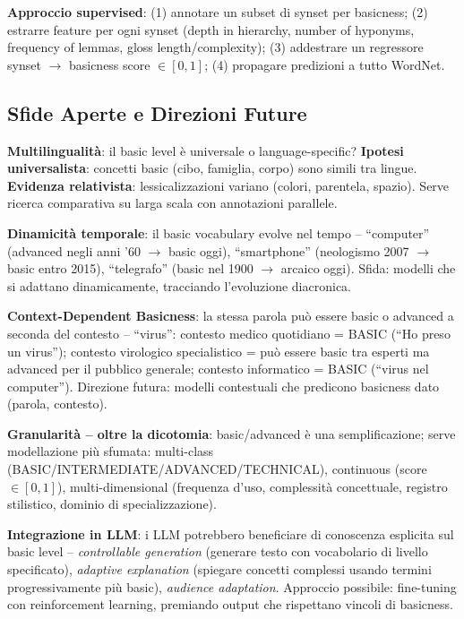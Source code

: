 \documentclass[12pt,a4paper]{article}
\begin{document}
\textbf{Approccio supervised}: (1) annotare un subset di synset per basicness; (2) estrarre feature per ogni synset (depth in hierarchy, number of hyponyms, frequency of lemmas, gloss length/complexity); (3) addestrare un regressore synset $\to$ basicness score $\in [0,1]$; (4) propagare predizioni a tutto WordNet.

\subsection{Sfide Aperte e Direzioni Future}

\textbf{Multilingualit\`a}: il basic level \`e universale o language-specific? \textbf{Ipotesi universalista}: concetti basic (cibo, famiglia, corpo) sono simili tra lingue. \textbf{Evidenza relativista}: lessicalizzazioni variano (colori, parentela, spazio). Serve ricerca comparativa su larga scala con annotazioni parallele.

\textbf{Dinamicit\`a temporale}: il basic vocabulary evolve nel tempo -- ``computer'' (advanced negli anni '60 $\to$ basic oggi), ``smartphone'' (neologismo 2007 $\to$ basic entro 2015), ``telegrafo'' (basic nel 1900 $\to$ arcaico oggi). Sfida: modelli che si adattano dinamicamente, tracciando l'evoluzione diacronica.

\textbf{Context-Dependent Basicness}: la stessa parola pu\`o essere basic o advanced a seconda del contesto -- ``virus'': contesto medico quotidiano = BASIC (``Ho preso un virus''); contesto virologico specialistico = pu\`o essere basic tra esperti ma advanced per il pubblico generale; contesto informatico = BASIC (``virus nel computer''). Direzione futura: modelli contestuali che predicono basicness dato (parola, contesto).

\textbf{Granularit\`a -- oltre la dicotomia}: basic/advanced \`e una semplificazione; serve modellazione pi\`u sfumata: multi-class (BASIC/INTERMEDIATE/ADVANCED/TECHNICAL), continuous (score $\in[0,1]$), multi-dimensional (frequenza d'uso, complessit\`a concettuale, registro stilistico, dominio di specializzazione).

\textbf{Integrazione in LLM}: i LLM potrebbero beneficiare di conoscenza esplicita sul basic level -- \emph{controllable generation} (generare testo con vocabolario di livello specificato), \emph{adaptive explanation} (spiegare concetti complessi usando termini progressivamente pi\`u basic), \emph{audience adaptation}. Approccio possibile: fine-tuning con reinforcement learning, premiando output che rispettano vincoli di basicness.
\end{document}
